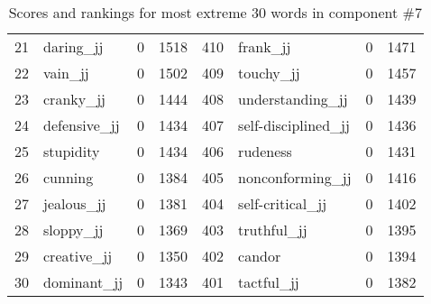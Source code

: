 \begin{table}[tbp]
\begin{tabular}{| rlr@{.}l | rlr@{.}l |}
    21 & daring\_jj & 0 & 1518    &    410 & frank\_jj & 0 & 1471 \\
    22 & vain\_jj & 0 & 1502    &    409 & touchy\_jj & 0 & 1457 \\
    23 & cranky\_jj & 0 & 1444    &    408 & understanding\_jj & 0 & 1439 \\
    24 & defensive\_jj & 0 & 1434    &    407 & self-disciplined\_jj & 0 & 1436 \\
    25 & stupidity & 0 & 1434    &    406 & rudeness & 0 & 1431 \\
    26 & cunning & 0 & 1384    &    405 & nonconforming\_jj & 0 & 1416 \\
    27 & jealous\_jj & 0 & 1381    &    404 & self-critical\_jj & 0 & 1402 \\
    28 & sloppy\_jj & 0 & 1369    &    403 & truthful\_jj & 0 & 1395 \\
    29 & creative\_jj & 0 & 1350    &    402 & candor & 0 & 1394 \\
    30 & dominant\_jj & 0 & 1343    &    401 & tactful\_jj & 0 & 1382 \\
    \hline
    \end{tabular}
    \caption{Scores and rankings for most extreme 30 words in component \#7} 
\end{table}
\clearpage
